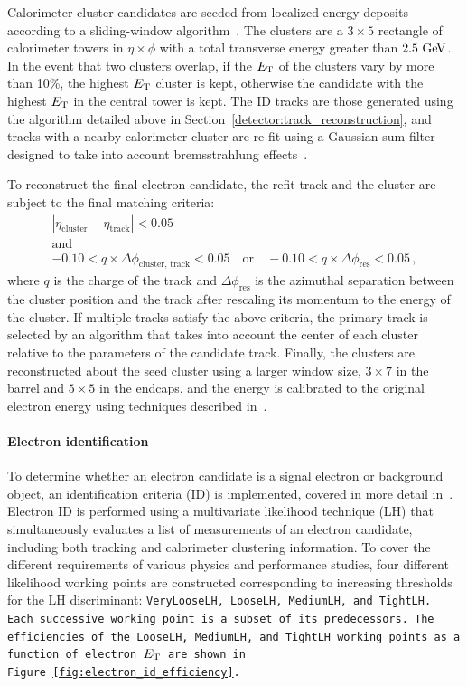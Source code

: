 Calorimeter cluster candidates are seeded from localized energy deposits according to a sliding-window algorithm~\cite{2008.sliding-window}.
The clusters are a $3\times 5$ rectangle of calorimeter towers in $\eta\times\phi$ with a total transverse energy greater than $2.5\gev$.
In the event that two clusters overlap, if the $E_{\mathrm{T}}$ of the clusters vary by more than 10\%, the highest $E_{\mathrm{T}}$ cluster is kept, otherwise the candidate with the highest $E_{\mathrm{T}}$ in the central tower is kept.
The ID tracks are those generated using the algorithm detailed above in Section~\ref{detector:track_reconstruction}, and tracks with a nearby calorimeter cluster are re-fit using a Gaussian-sum filter designed to take into account bremsstrahlung effects~\cite{2003.gsf}.

To reconstruct the final electron candidate, the refit track and the cluster are subject to the final matching criteria:
\begin{equation}
  \begin{gathered}
  |\eta_{\textrm{cluster}} - \eta_{\textrm{track}}| < 0.05 \\
  \textrm{and}\\
   -0.10 < q\times \Delta\phi_{\textrm{cluster, track}} < 0.05 \quad\textrm{or}\quad -0.10 < q\times \Delta\phi_{\textrm{res}} < 0.05\,,
  \end{gathered}
\end{equation}
where $q$ is the charge of the track and $\Delta\phi_{\textrm{res}}$ is the azimuthal separation between the cluster position and the track after rescaling its momentum to the energy of the cluster.
If multiple tracks satisfy the above criteria, the primary track is selected by an algorithm that takes into account the center of each cluster relative to the parameters of the candidate track.
Finally, the clusters are reconstructed about the seed cluster using a larger window size, $3\times 7$ in the barrel and $5\times 5$ in the endcaps, and the energy is calibrated to the original electron energy using techniques described in~\cite{2014.electron-calibration-run1, 2018.electron-calibration-run2}.

\paragraph*{Electron identification}
To determine whether an electron candidate is a signal electron or background object, an identification criteria (ID) is implemented, covered in more detail in~\cite{2019.electron-reco-id, 2016.electron-performance-13tev}.
Electron ID is performed using a multivariate likelihood technique (LH) that simultaneously evaluates a list of measurements of an electron candidate, including both tracking and calorimeter clustering information.
To cover the different requirements of various physics and performance studies, four different likelihood working points are constructed corresponding to increasing thresholds for the LH discriminant: \tt{VeryLooseLH}, \tt{LooseLH}, \tt{MediumLH}, and \tt{TightLH}.
Each successive working point is a subset of its predecessors.
The efficiencies of the \tt{LooseLH}, \tt{MediumLH}, and \tt{TightLH} working points as a function of electron $E_{\mathrm{T}}$ are shown in Figure~\ref{fig:electron_id_efficiency}.


